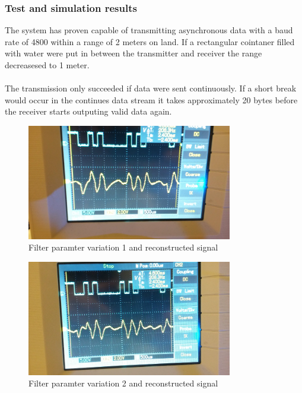 \newpage

\subsubsection{Test and simulation results}
The system has proven capable of transmitting asynchronous data with a baud rate of 4800 within a range of 2 meters on land. If a rectangular cointaner filled with water were put in between the transmitter and receiver the range decreasesed to 1 meter. \\\\
The transmission only succeeded if data were sent continuously. If a short break would occur in the continues data stream it takes approximately 20 bytes before the receiver starts outputing valid data again.

\begin{figure}[h]
\centering
\includegraphics[width=0.8\textwidth]{pic1}
\caption{Filter paramter variation 1  and reconstructed signal}
\label{fig:rec}
\end{figure}

\begin{figure}[h]
\centering
\includegraphics[width=0.8\textwidth]{pic2}
\caption{Filter paramter variation 2 and reconstructed signal}
\label{fig:rec}
\end{figure}




